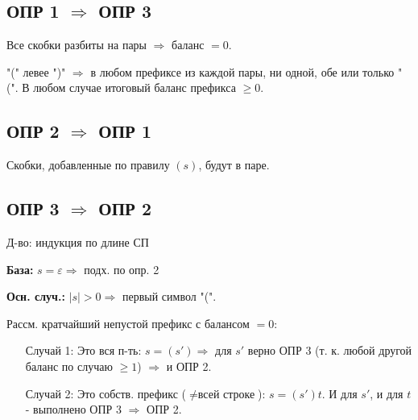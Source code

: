 \documentclass[12pt]{article}
\theoremstyle{definition}
\theoremstyle{definition}
\begin{document}
\subsection{ОПР 1 $\Rightarrow$ ОПР 3}
Все скобки разбиты на пары $\Rightarrow$ баланс $ = 0$.

 "(" левее ")" $\Rightarrow$ в любом префиксе из каждой пары, ни одной, обе или только "(". В любом случае итоговый баланс префикса $\geq 0$.

\subsection{ОПР 2 $\Rightarrow$ ОПР 1}

Скобки, добавленные по правилу $(s)$, будут в паре.

\subsection{ОПР 3 $\Rightarrow$ ОПР 2}

Д-во: индукция по длине СП

\textbf{База:} $s = \varepsilon \Rightarrow $ подх. по опр. 2

\textbf{Осн. случ.:} $|s| > 0 \Rightarrow $ первый символ "(".

Рассм. кратчайший непустой префикс с балансом  $ = 0$:
\begin{itemize}
    \item [Случай 1: ] Это вся п-ть: $ s = (s') \Rightarrow $ для $s'$ верно ОПР 3 (т. к. любой другой баланс по случаю $ \geq 1$) $\Rightarrow$ и ОПР 2.
    \item [Случай 2: ] Это собств. префикс ($\neq \text{всей строке}$): $s = (s')t$. И для $s'$, и для $t$ - выполнено ОПР 3 $ \Rightarrow $ ОПР 2.
\end{itemize}
\end{document}
